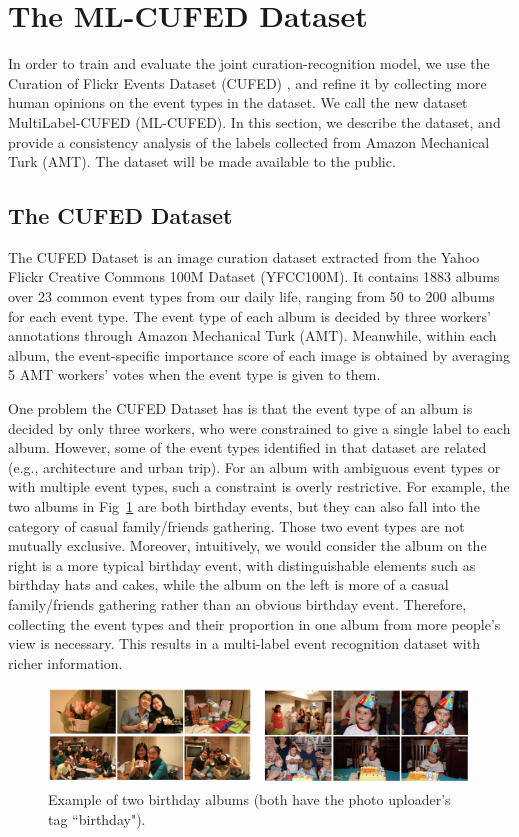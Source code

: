 \documentclass[runningheads]{llncs}
\begin{document}
\section{The ML-CUFED Dataset}
In order to train and evaluate the joint curation-recognition model, we use the Curation of Flickr Events Dataset (CUFED) \cite{CVPR}, and refine it by collecting more human opinions on the event types in the dataset. We call the new dataset MultiLabel-CUFED (ML-CUFED). In this section, we describe the dataset, and provide a consistency analysis of the labels collected from Amazon Mechanical Turk (AMT). The dataset will be made available to the public.
\subsection{The CUFED Dataset}
The CUFED Dataset \cite{CVPR} is an image curation dataset extracted from the Yahoo Flickr Creative Commons 100M Dataset (YFCC100M).  It contains 1883 albums over 23 common event types from our daily life, ranging from 50 to 200 albums for each event type. The event type of each album is decided by three workers' annotations through Amazon Mechanical Turk (AMT). Meanwhile, within each album, the event-specific importance score of each image is obtained by averaging 5 AMT workers' votes when the event type is given to them. 

One problem the CUFED Dataset has is that the event type of an album is decided by only three workers, who were constrained to give a single label to each album. However, some of the event types identified in that dataset are related (e.g., architecture and urban trip). For an album with ambiguous event types or with multiple event types, such a constraint is overly restrictive. For example, the two albums in Fig~\ref{album} are both birthday events, but they can also fall into the category of casual family/friends gathering. Those two event types are not mutually exclusive. Moreover, intuitively, we would consider the album on the right is a more typical birthday event, with distinguishable elements such as birthday hats and cakes, while the album on the left is more of a casual family/friends gathering rather than an obvious birthday event. Therefore, collecting the event types and their proportion in one album from more people's view is necessary. This results in a multi-label event recognition dataset with richer information. 
\begin{figure}
\centering
\includegraphics[width=4.5in]{album}
\caption{Example of two birthday albums (both have the photo uploader's tag ``birthday"). }
\label{album}
\vspace{-0.15in}
\end{figure}
\end{document}
